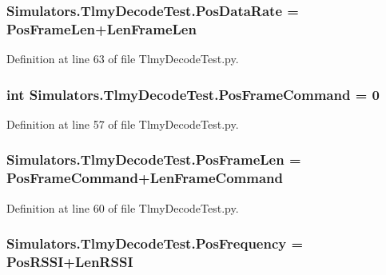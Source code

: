 \subsubsection[{Pos\+Data\+Rate}]{\setlength{\rightskip}{0pt plus 5cm}Simulators.\+Tlmy\+Decode\+Test.\+Pos\+Data\+Rate = {\bf Pos\+Frame\+Len}+{\bf Len\+Frame\+Len}}\label{namespace_simulators_1_1_tlmy_decode_test_af8aa110404c9f747ad0f9cac7b852c75}


Definition at line 63 of file Tlmy\+Decode\+Test.\+py.

\hypertarget{namespace_simulators_1_1_tlmy_decode_test_ae6bd3c16c47704c1b06682176682dbe2}{}
\subsubsection[{Pos\+Frame\+Command}]{\setlength{\rightskip}{0pt plus 5cm}int Simulators.\+Tlmy\+Decode\+Test.\+Pos\+Frame\+Command = 0}\label{namespace_simulators_1_1_tlmy_decode_test_ae6bd3c16c47704c1b06682176682dbe2}


Definition at line 57 of file Tlmy\+Decode\+Test.\+py.

\hypertarget{namespace_simulators_1_1_tlmy_decode_test_a73e42869ff64bec4ebd7b1df0559972b}{}
\subsubsection[{Pos\+Frame\+Len}]{\setlength{\rightskip}{0pt plus 5cm}Simulators.\+Tlmy\+Decode\+Test.\+Pos\+Frame\+Len = {\bf Pos\+Frame\+Command}+{\bf Len\+Frame\+Command}}\label{namespace_simulators_1_1_tlmy_decode_test_a73e42869ff64bec4ebd7b1df0559972b}


Definition at line 60 of file Tlmy\+Decode\+Test.\+py.

\hypertarget{namespace_simulators_1_1_tlmy_decode_test_a2f882befbc8ebd0ec3d730fca374692f}{}
\subsubsection[{Pos\+Frequency}]{\setlength{\rightskip}{0pt plus 5cm}Simulators.\+Tlmy\+Decode\+Test.\+Pos\+Frequency = {\bf Pos\+R\+S\+S\+I}+{\bf Len\+R\+S\+S\+I}}\label{namespace_simulators_1_1_tlmy_decode_test_a2f882befbc8ebd0ec3d730fca374692f}


